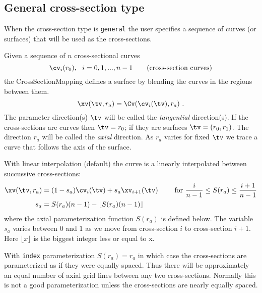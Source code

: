 \subsection{General cross-section type}
When the cross-section type is {\tt general} the user specifies a sequence of curves (or surfaces)
that will be used as the cross-sections.

Given a sequence of $n$ cross-sectional curves
\[
 \cv_i(r_0), ~~i=0,1,...,n-1  \qquad \mbox{(cross-section curves)}
\]
the {\ff CrossSectionMapping} defines a surface by blending the curves in the
regions between them.
\[
      \xv(\tv,r_a) = \Cv(\cv_i(\tv), r_a)~.
\]
The parameter direction(s) $\tv$ will be called the {\em tangential} direction(s). If the
cross-sections are curves then $\tv=r_0$; if they are surfaces $\tv=(r_0,r_1)$.
The direction $r_a$ will
be called the {\em axial} direction. As $r_a$ varies for fixed $\tv$ we trace a curve
that follows the axis of the surface.

With linear interpolation (default) the curve is a linearly interpolated between
succussive cross-sections:
\begin{align*}
     \xv(\tv,r_a) & = (1-s_a) \cv_i(\tv) + s_a \xv_{i+1}(\tv) 
       \qquad \mbox{~for~}  {i\over n-1} \le S(r_a) \le {i+1 \over n-1} \\
  s_a &= S(r_a)(n-1) - \lfloor S(r_a) (n-1) \rfloor
\end{align*}
where the axial parameterization function $S(r_a)$ is defined below.
The variable $s_a$ varies between $0$ and $1$ as we move from cross-section $i$
to cross-section $i+1$.
Here $\lfloor x \rfloor$ is the biggest integer less or equal to x.

With {\tt index} parameterization $S(r_a)=r_a$ in which case the cross-sections
are parameterized as if they were equally spaced. Thus there will be approximately
an equal number of axial grid lines between any two cross-sections. Normally this
is not a good parameterization unless the cross-sections are nearly equally spaced.

